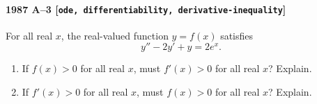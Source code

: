 \paragraph{1987 A--3 \textnormal{[\texttt{ode, differentiability, derivative-inequality}]}}
For all real $x$, the real-valued function $y=f(x)$ satisfies
\[
y''-2y'+y=2e^x.
\]
\begin{enumerate}
\item[(a)] If $f(x)>0$ for all real $x$, must $f'(x) > 0$ for all real $x$? Explain.
\item[(b)] If $f'(x)>0$ for all real $x$, must $f(x) > 0$ for all real $x$? Explain.
\end{enumerate}
